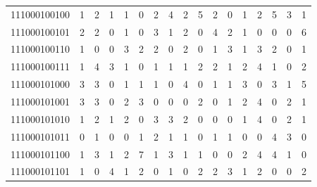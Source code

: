\documentclass[10pt,a4paper]{article}
\begin{document}
\begin{longtable}{ |c|c|c|c|c|c|c|c|c|c|c|c|c|c|c|c|c| }
    111000100100              & 1                            & 2                                & 1                            & 1                              & 0   & 2   & 4   & 2   & 5   & 2   & 0   & 1   & 2   & 5   & 3   & 1   \\
    111000100101              & 2                            & 2                                & 0                            & 1                              & 0   & 3   & 1   & 2   & 0   & 4   & 2   & 1   & 0   & 0   & 0   & 6   \\
    111000100110              & 1                            & 0                                & 0                            & 3                              & 2   & 2   & 0   & 2   & 0   & 1   & 3   & 1   & 3   & 2   & 0   & 1   \\
    111000100111              & 1                            & 4                                & 3                            & 1                              & 0   & 1   & 1   & 1   & 2   & 2   & 1   & 2   & 4   & 1   & 0   & 2   \\
    111000101000              & 3                            & 3                                & 0                            & 1                              & 1   & 1   & 0   & 4   & 0   & 1   & 1   & 3   & 0   & 3   & 1   & 5   \\
    111000101001              & 3                            & 3                                & 0                            & 2                              & 3   & 0   & 0   & 0   & 2   & 0   & 1   & 2   & 4   & 0   & 2   & 1   \\
    111000101010              & 1                            & 2                                & 1                            & 2                              & 0   & 3   & 3   & 2   & 0   & 0   & 0   & 1   & 4   & 0   & 2   & 1   \\
    111000101011              & 0                            & 1                                & 0                            & 0                              & 1   & 2   & 1   & 1   & 0   & 1   & 1   & 0   & 0   & 4   & 3   & 0   \\
    111000101100              & 1                            & 3                                & 1                            & 2                              & 7   & 1   & 3   & 1   & 1   & 0   & 0   & 2   & 4   & 4   & 1   & 0   \\
    111000101101              & 1                            & 0                                & 4                            & 1                              & 2   & 0   & 1   & 0   & 2   & 2   & 3   & 1   & 2   & 0   & 0   & 2   \\

\end{longtable}
\end{document}
